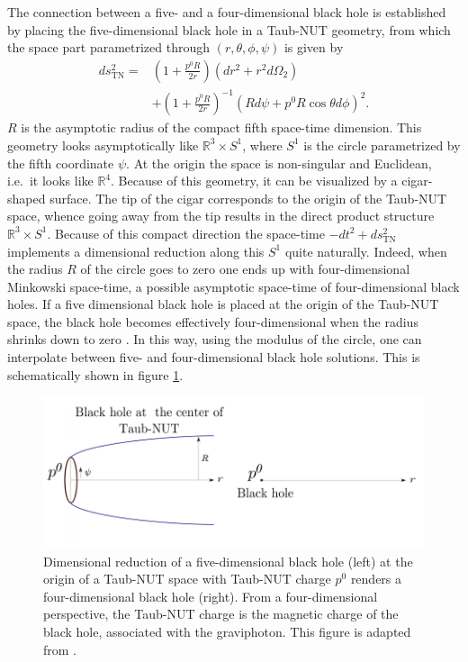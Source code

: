 \documentclass[12pt,twoside]{book}
\begin{document}
The connection between a five- and a four-dimensional black hole is established by placing the five-dimensional black hole in a Taub-NUT geometry, from which the space part parametrized through $(r,\theta,\phi,\psi)$ is given by
\begin{equation}
\begin{split}
ds^{2}_{\mathrm{TN}} = & \left( 1 + \frac{p^{0} R}{2r} \right) ( dr^{2} + r^{2}d\Omega_{2} ) \\
& + \left( 1 + \frac{p^{0} R}{2r} \right)^{-1} (R d\psi + p^{0} R \cos \theta d\phi)^{2}.
\end{split}
\end{equation}
$R$ is the asymptotic radius of the compact fifth space-time dimension.
This geo\-metry looks asymptotically like $\mathbb{R}^{3} \times S^{1}$, where $S^{1}$ is the circle parametrized by the fifth coordinate $\psi$. At the origin the space is non-singular and Euclidean, i.e.\ it looks like $\mathbb{R}^{4}$. Because of this geometry, it can be visualized by a cigar-shaped surface. The tip of the cigar corresponds to the origin of the Taub-NUT space, whence going away from the tip results in the direct product structure $\mathbb{R}^{3} \times S^{1}$. Because of this compact direction the space-time $-dt^{2} + ds^{2}_{\mathrm{TN}}$ implements a dimensional reduction along this $S^{1}$ quite naturally. Indeed, when the radius $R$ of the circle goes to zero one ends up with four-dimensional Minkowski space-time, a possible asymptotic space-time of four-dimensional black holes. If a five dimensional black hole is placed at the origin of the Taub-NUT space, the black hole becomes effectively four-dimensional when the radius shrinks down to zero . In this way, using the modulus of the circle, one can interpolate between five- and four-dimensional black hole solutions. This is schematically shown in figure \ref{Taub-NUTcigar}.
%
\begin{figure}[h]\label{Taub-NUTcigar}
\centering
\includegraphics{Taub-NUT.png}
\caption{Dimensional reduction of a five-dimensional black hole (left) at the origin of a Taub-NUT space with Taub-NUT charge $p^{0}$ renders a four-dimensional black hole (right). From a four-dimensional perspective, the Taub-NUT charge is the magnetic charge of the black hole, associated with the graviphoton. This figure is adapted from \cite{Goldstein:2007kx}.}
\end{figure}
\end{document}
